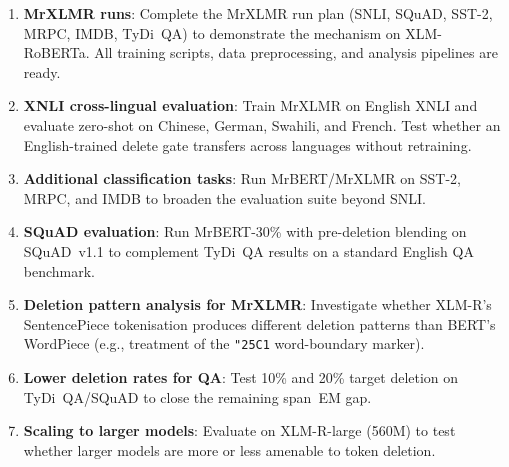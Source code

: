 \begin{enumerate}[nosep]
    \item \textbf{MrXLMR runs}: Complete the MrXLMR run plan (SNLI, SQuAD, SST-2, MRPC, IMDB, TyDi~QA) to demonstrate the mechanism on XLM-RoBERTa. All training scripts, data preprocessing, and analysis pipelines are ready.
    \item \textbf{XNLI cross-lingual evaluation}: Train MrXLMR on English XNLI and evaluate zero-shot on Chinese, German, Swahili, and French. Test whether an English-trained delete gate transfers across languages without retraining.
    \item \textbf{Additional classification tasks}: Run MrBERT/MrXLMR on SST-2, MRPC, and IMDB to broaden the evaluation suite beyond SNLI.
    \item \textbf{SQuAD evaluation}: Run MrBERT-30\% with pre-deletion blending on SQuAD~v1.1 to complement TyDi~QA results on a standard English QA benchmark.
    \item \textbf{Deletion pattern analysis for MrXLMR}: Investigate whether XLM-R's SentencePiece tokenisation produces different deletion patterns than BERT's WordPiece (e.g., treatment of the \texttt{\char"25C1} word-boundary marker).
    \item \textbf{Lower deletion rates for QA}: Test 10\% and 20\% target deletion on TyDi~QA/SQuAD to close the remaining span~EM gap.
    \item \textbf{Scaling to larger models}: Evaluate on XLM-R-large (560M) to test whether larger models are more or less amenable to token deletion.
\end{enumerate}



%
